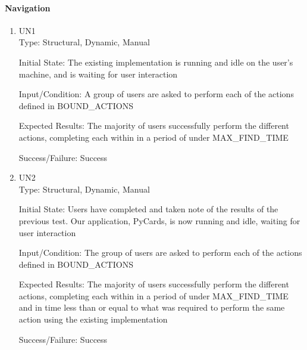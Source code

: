 \documentclass[12pt, titlepage]{article}
\begin{document}
	\paragraph{Navigation}
	\begin{enumerate}
	\item{UN1\\}
		Type: Structural, Dynamic, Manual
		
		Initial State: The existing implementation is running and idle on the user's
		machine, and is waiting for user interaction
		
		Input/Condition: A group of users are asked to perform each of the actions
		defined in BOUND\_ACTIONS
		
		Expected Results: The majority of users successfully perform the different
		actions, completing each within in a period of under MAX\_FIND\_TIME

		Success/Failure: Success

		\item{UN2\\}
		Type: Structural, Dynamic, Manual
		
		Initial State: Users have completed and taken note of the results of the
		previous test. Our application, PyCards, is now running and idle, waiting for
		user interaction
		
		Input/Condition: The group of users are asked to perform each of the actions
		defined in BOUND\_ACTIONS
		
		Expected Results: The majority of users successfully perform the different
		actions, completing each within in a period of under MAX\_FIND\_TIME and in
		time less than or equal to what was required to perform the same action using
		the existing implementation

		Success/Failure: Success
	\end{enumerate}
\end{document}

